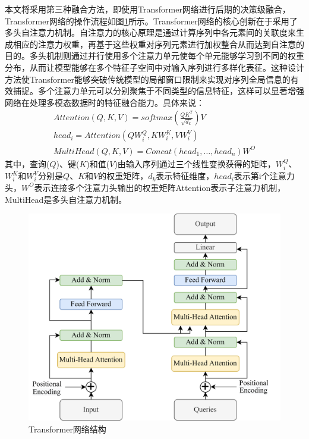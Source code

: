 本文将采用第三种融合方法，即使用Transformer网络进行后期的决策级融合，Transformer网络的操作流程如图\ref{ftransformer}所示。Transformer网络的核心创新在于采用了多头自注意力机制\cite{niu2021review}。自注意力的核心原理是通过计算序列中各元素间的关联度来生成相应的注意力权重，再基于这些权重对序列元素进行加权整合从而达到自注意的目的。多头机制则通过并行使用多个注意力单元使每个单元能够学习到不同的权重分布，从而让模型能够在多个特征子空间中对输入序列进行多样化表征。这种设计方法使Transformer能够突破传统模型的局部窗口限制来实现对序列全局信息的有效捕捉。多个注意力单元可以分别聚焦于不同类型的信息特征，这样可以显著增强网络在处理多模态数据时的特征融合能力。具体来说：
\begin{equation}
    \begin{array}{c}
Attention\left( {Q,K,V} \right) = softmax\left( {\frac{{Q{K^T}}}{{\sqrt {{d_k}} }}} \right)V\\
hea{d_i} = Attention\left( {QW_i^Q,KW_i^K,VW_i^V} \right)\\
MultiHead\left( {Q,K,V} \right) = Concat\left( {hea{d_1}, \ldots ,hea{d_n}} \right){W^O}
\end{array}
    \label{myeq7}
\end{equation}
其中，查询($Q$)、键($K$)和值($V$)由输入序列通过三个线性变换获得的矩阵，$W_i^Q$、$W_i^K$和$W_i^V$分别是$Q$、$K$和$V$的权重矩阵，${d_k}$表示特征维度，$hea{d_i}$表示第i个注意力头，${W^O}$表示连接多个注意力头输出的权重矩阵Attention表示子注意力机制，MultiHead是多头自注意力机制。
\begin{figure}[htbp]
    \centering
    \includegraphics[scale=0.10]{Fig/transformer.png}
    \caption{\label{ftransformer}Transformer网络结构}
\end{figure}

